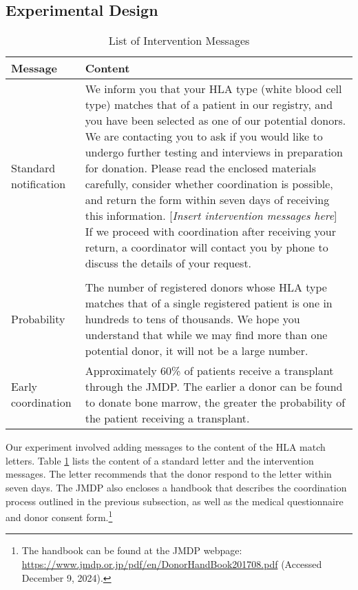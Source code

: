 \documentclass[12pt, a4paper]{article}
\begin{document}
\hypertarget{design}{%
\subsection{Experimental Design}\label{design}}

\begin{table}

\caption{\label{tab:list-message}List of Intervention Messages}
\centering
\fontsize{8}{10}\selectfont
\begin{tabular}[t]{l>{\raggedright\arraybackslash}p{40em}}
\toprule
Message & Content\\
\midrule
Standard notification & We inform you that your HLA type (white blood cell type) matches that of a patient in our registry, and you have been selected as one of our potential donors. We are contacting you to ask if you would like to undergo further testing and interviews in preparation for donation. Please read the enclosed materials carefully, consider whether coordination is possible, and return the form within seven days of receiving this information. [\emph{Insert intervention messages here}] If we proceed with coordination after receiving your return, a coordinator will contact you by phone to discuss the details of your request.\\
\addlinespace[0.3em]
\multicolumn{2}{l}{\textbf{Intervention message}}\\
\hspace{1em}Probability & The number of registered donors whose HLA type matches that of a single registered patient is one in hundreds to tens of thousands. We hope you understand that while we may find more than one potential donor, it will not be a large number.\\
\hspace{1em}Early coordination & Approximately 60\% of patients receive a transplant through the JMDP. The earlier a donor can be found to donate bone marrow, the greater the probability of the patient receiving a transplant.\\
\bottomrule
\end{tabular}
\end{table}

Our experiment involved adding messages to the content of the HLA match letters. Table \ref{tab:list-message} lists the content of a standard letter and the intervention messages. The letter recommends that the donor respond to the letter within seven days. The JMDP also encloses a handbook that describes the coordination process outlined in the previous subsection, as well as the medical questionnaire and donor consent form.\footnote{The handbook can be found at the JMDP webpage: \url{https://www.jmdp.or.jp/pdf/en/DonorHandBook201708.pdf} (Accessed December 9, 2024).}
\end{document}
